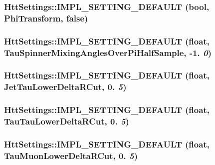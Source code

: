 \hypertarget{classHttSettings_ae8163b41b1187ab3e0f2f808082a18ac}{
\subsubsection[{IMPL\_\-SETTING\_\-DEFAULT}]{\setlength{\rightskip}{0pt plus 5cm}HttSettings::IMPL\_\-SETTING\_\-DEFAULT (bool, \/  PhiTransform, \/  false)}}
\label{classHttSettings_ae8163b41b1187ab3e0f2f808082a18ac}
\hypertarget{classHttSettings_af0a655ffdbcff54a4d4d0fbbde8bccf0}{
\subsubsection[{IMPL\_\-SETTING\_\-DEFAULT}]{\setlength{\rightskip}{0pt plus 5cm}HttSettings::IMPL\_\-SETTING\_\-DEFAULT (float, \/  TauSpinnerMixingAnglesOverPiHalfSample, \/  -\/1. {\em 0})}}
\label{classHttSettings_af0a655ffdbcff54a4d4d0fbbde8bccf0}
\hypertarget{classHttSettings_a0761009fdeef4d51d6a22430aede8fdf}{
\subsubsection[{IMPL\_\-SETTING\_\-DEFAULT}]{\setlength{\rightskip}{0pt plus 5cm}HttSettings::IMPL\_\-SETTING\_\-DEFAULT (float, \/  JetTauLowerDeltaRCut, \/  0. {\em 5})}}
\label{classHttSettings_a0761009fdeef4d51d6a22430aede8fdf}
\hypertarget{classHttSettings_a6eae32445118b93d4b062fcc41517f2d}{
\subsubsection[{IMPL\_\-SETTING\_\-DEFAULT}]{\setlength{\rightskip}{0pt plus 5cm}HttSettings::IMPL\_\-SETTING\_\-DEFAULT (float, \/  TauTauLowerDeltaRCut, \/  0. {\em 5})}}
\label{classHttSettings_a6eae32445118b93d4b062fcc41517f2d}
\hypertarget{classHttSettings_a1d665e4d010863f0c9115b4b1070ca17}{
\subsubsection[{IMPL\_\-SETTING\_\-DEFAULT}]{\setlength{\rightskip}{0pt plus 5cm}HttSettings::IMPL\_\-SETTING\_\-DEFAULT (float, \/  TauMuonLowerDeltaRCut, \/  0. {\em 5})}}
